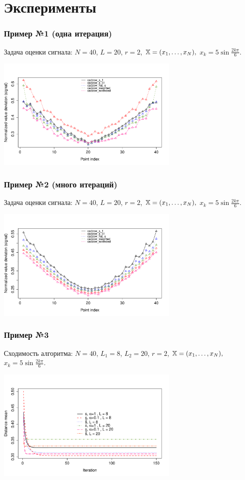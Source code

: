 \documentclass[unicode, notheorems]{beamer}
\begin{document}
\section{Эксперименты}
\begin{frame}
	\frametitle{Пример №1 (одна итерация)}
	Задача оценки сигнала: $N = 40$, $L = 20$, $r = 2$, $\mathbb{X} = (x_{1}, \ldots, x_N),$  $x_k = 5\sin{\frac{2 k \pi}{6}}$.
	\begin{center}
		\includegraphics*[width = 9cm]{s1_it1.pdf}
	\end{center}
	
	
\end{frame}

\begin{frame}
	\frametitle{Пример №2 (много итераций)}
	Задача оценки сигнала: $N = 40$, $L = 20$, $r = 2$, $\mathbb{X} = (x_{1}, \ldots, x_N),$  $x_k = 5\sin{\frac{2 k \pi}{6}}$.
	
	\begin{center}
		\includegraphics*[width = 9cm]{s1_it100.pdf}
	\end{center}
	
\end{frame}

\begin{frame}
	\frametitle{Пример №3}
	Сходимость алгоритма: $N = 40$, $L_1 = 8$, $L_2 = 20$, $r = 2$, $\mathbb{X} = (x_{1}, \ldots, x_N),$  $x_k = 5\sin{\frac{2 k \pi}{6}}$.
	
	\begin{center}
		\includegraphics*[width = 9cm]{cadzowspeed_2.pdf}
	\end{center}
	
\end{frame}
\end{document}
